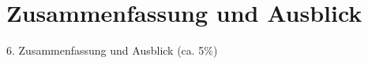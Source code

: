 \chapter{Zusammenfassung und Ausblick}
\label{sec:Zusammenfassung}

6. Zusammenfassung und Ausblick (ca. 5\%)
\cite{abrahams1984}